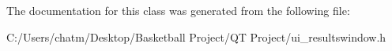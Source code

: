 The documentation for this class was generated from the following file\+:\begin{DoxyCompactItemize}
\item 
C\+:/\+Users/chatm/\+Desktop/\+Basketball Project/\+Q\+T Project/ui\+\_\+resultswindow.\+h\end{DoxyCompactItemize}
